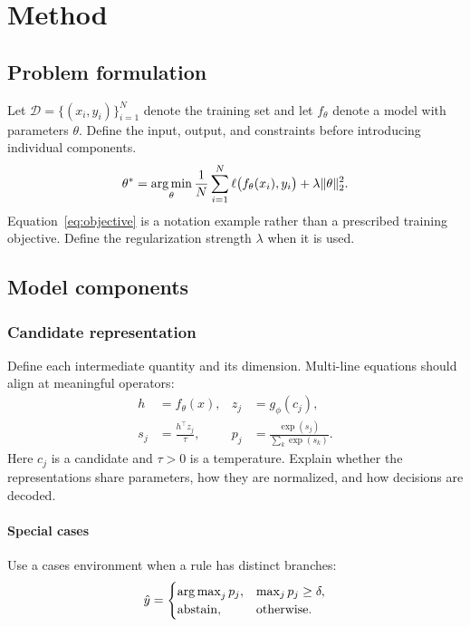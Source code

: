 \section{Method}\label{sec:method}
\subsection{Problem formulation}
Let $\mathcal{D}=\{(x_i,y_i)\}_{i=1}^{N}$ denote the training set and let
$f_\theta$ denote a model with parameters $\theta$. Define the input, output,
and constraints before introducing individual components.
\begin{equation}
  \theta^* = \operatorname*{arg\,min}_{\theta}\frac{1}{N}\sum_{i=1}^{N}
  \ell\bigl(f_\theta(x_i),y_i\bigr)
  +\lambda\lVert\theta\rVert_2^2.
  \label{eq:objective}
\end{equation}
Equation~\eqref{eq:objective} is a notation example rather than a prescribed
training objective. Define the regularization strength $\lambda$ when it is used.

\subsection{Model components}
\subsubsection{Candidate representation}
Define each intermediate quantity and its dimension. Multi-line equations
should align at meaningful operators:
\begin{align}
  h &= f_\theta(x), & z_j &= g_\phi(c_j),\label{eq:representations}\\
  s_j &= \frac{h^\top z_j}{\tau}, &
  p_j &= \frac{\exp(s_j)}{\sum_k\exp(s_k)}.\label{eq:probability}
\end{align}
Here $c_j$ is a candidate and $\tau>0$ is a temperature. Explain whether the
representations share parameters, how they are normalized, and how decisions
are decoded.

\paragraph{Special cases}
Use a cases environment when a rule has distinct branches:
\begin{equation}
  \hat y = \begin{cases}
    \operatorname*{arg\,max}_j p_j, & \max_j p_j\geq\delta,\\
    \text{abstain}, & \text{otherwise}.
  \end{cases}
\end{equation}


